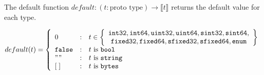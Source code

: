 \vspace{1em}
\begin{definition}
  The default function
  $default: (t:\text{proto type}) \rightarrow \llbracket t \rrbracket$ returns the default
  value for each type.
  
  \[ default(t) = \left\{ 
    \begin{array}{l@{\quad:\quad}l}
      0 & t \in \left\{\begin{array}{c}
        \mathtt{int32}, \mathtt{int64}, \mathtt{uint32},
        \mathtt{uint64}, \mathtt{sint32}, \mathtt{sint64}, \\ \mathtt{fixed32},
        \mathtt{fixed64}, \mathtt{sfixed32}, \mathtt{sfixed64}, \mathtt{enum}
      \end{array}\right\} \\
      \mathtt{false} & t \text{ is } \mathtt{bool} \\
      "" & t \text{ is } \mathtt{string} \\
      \hspace{0pt}[\;] & t \text{ is } \mathtt{bytes}
    \end{array}\right.
  \]
\end{definition}

